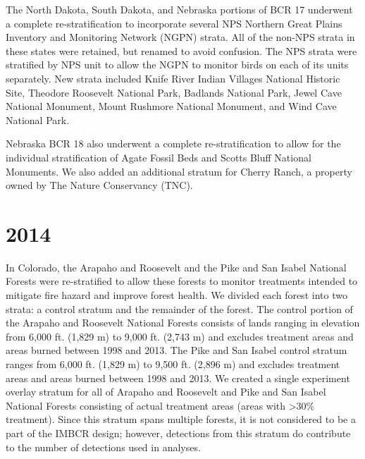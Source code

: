 \documentclass[
  letterpaper,
  DIV=11,
  numbers=noendperiod,
  oneside]{scrreprt}
\begin{document}
The North Dakota, South Dakota, and Nebraska portions of BCR 17
underwent a complete re-stratification to incorporate several NPS
Northern Great Plains Inventory and Monitoring Network (NGPN) strata.
All of the non-NPS strata in these states were retained, but renamed to
avoid confusion. The NPS strata were stratified by NPS unit to allow the
NGPN to monitor birds on each of its units separately. New strata
included Knife River Indian Villages National Historic Site, Theodore
Roosevelt National Park, Badlands National Park, Jewel Cave National
Monument, Mount Rushmore National Monument, and Wind Cave National Park.

Nebraska BCR 18 also underwent a complete re-stratification to allow for
the individual stratification of Agate Fossil Beds and Scotts Bluff
National Monuments. We also added an additional stratum for Cherry
Ranch, a property owned by The Nature Conservancy (TNC).

\hypertarget{section-5}{%
\section*{\texorpdfstring{\textbf{2014}}{2014}}\label{section-5}}


In Colorado, the Arapaho and Roosevelt and the Pike and San Isabel
National Forests were re-stratified to allow these forests to monitor
treatments intended to mitigate fire hazard and improve forest health.
We divided each forest into two strata: a control stratum and the
remainder of the forest. The control portion of the Arapaho and
Roosevelt National Forests consists of lands ranging in elevation from
6,000 ft. (1,829 m) to 9,000 ft. (2,743 m) and excludes treatment areas
and areas burned between 1998 and 2013. The Pike and San Isabel control
stratum ranges from 6,000 ft. (1,829 m) to 9,500 ft. (2,896 m) and
excludes treatment areas and areas burned between 1998 and 2013. We
created a single experiment overlay stratum for all of Arapaho and
Roosevelt and Pike and San Isabel National Forests consisting of actual
treatment areas (areas with \textgreater30\% treatment). Since this
stratum spans multiple forests, it is not considered to be a part of the
IMBCR design; however, detections from this stratum do contribute to the
number of detections used in analyses.
\end{document}
